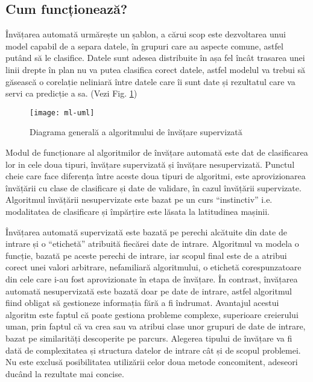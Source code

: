 	
	\subsection{Cum funcționează?}
	Învățarea automată urmărește un șablon, a cărui scop este dezvoltarea unui model capabil de a separa datele, în grupuri care au aspecte comune, astfel putând să le clasifice. Datele sunt adesea distribuite în așa fel încât trasarea unei linii drepte în plan nu va putea clasifica corect datele, astfel  modelul va trebui să găsească o corelație neliniară între datele care îi sunt date și rezultatul care va servi ca predicție a sa. (Vezi Fig. \ref{fig:uml-diagram})
	

	
	\begin{figure}[H]
		\texttt{[image: ml-uml]}  
		\caption{\label{fig:uml-diagram} Diagrama generală a algoritmului de învățare supervizată
		\protect
		\cite{ml_intro}}
	\end{figure}


	\newpage
	
	Modul de funcționare al algoritmilor de învățare automată este dat de clasificarea lor in cele doua tipuri, învățare supervizată și învățare nesupervizată. Punctul cheie care face diferența între aceste doua tipuri de algoritmi, este aprovizionarea învățării cu clase de clasificare și date de validare, în cazul învățării supervizate. Algoritmul învățării nesupervizate este bazat pe un curs “instinctiv” i.e. modalitatea de clasificare și împărțire este lăsata la latitudinea mașinii.
	
	Învățarea automată supervizată este bazată pe perechi alcătuite din date de intrare și o “etichetă” atribuită fiecărei date de intrare. Algoritmul va modela o funcție, bazată pe aceste perechi de intrare, iar scopul final este de a atribui corect unei valori arbitrare, nefamiliară algoritmului, o etichetă corespunzatoare din cele care i-au fost aprovizionate în etapa de învățare. 
	În contrast, învățarea automată nesupervizată este bazată doar pe date de intrare, astfel algoritmul fiind obligat să gestioneze informația fără a fi îndrumat. Avantajul acestui algoritm este faptul că poate gestiona probleme complexe, superioare creierului uman, prin faptul că va crea sau va atribui clase unor grupuri de date de intrare, bazat pe similarități descoperite pe parcurs.
	Alegerea tipului de învățare va fi dată de complexitatea și structura  datelor de intrare cât și de scopul problemei. Nu este exclusă posibilitatea utilizării celor doua metode concomitent, adeseori ducând la rezultate mai concise.
	
